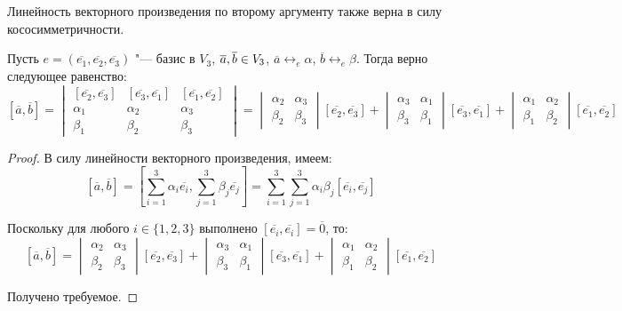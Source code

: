 \begin{note}
	Линейность векторного произведения по второму аргументу также верна в силу кососимметричности.
\end{note}

\begin{theorem}
	Пусть $e = (\overline{e_1}, \overline{e_2}, \overline{e_3})$ "--- базис в $V_3$, $\overline{a}, \overline{b} \hm{\in} V_3$, $\overline{a} \leftrightarrow_{e} \alpha$, $\overline{b} \leftrightarrow_{e} \beta$. Тогда верно следующее равенство:
	\[[\overline{a}, \overline{b}] =
	\begin{vmatrix}
	[\overline{e_2}, \overline{e_3}] & [\overline{e_3}, \overline{e_1}] & [\overline{e_1}, \overline{e_2}]\\
	\alpha_1 & \alpha_2 & \alpha_3\\
	\beta_1 & \beta_2 & \beta_3
	\end{vmatrix} = \begin{vmatrix}
	\alpha_2 & \alpha_3\\
	\beta_2 & \beta_3
	\end{vmatrix}[\overline{e_2}, \overline{e_3}] + 
	\begin{vmatrix}
	\alpha_3 & \alpha_1\\
	\beta_3 & \beta_1
	\end{vmatrix}[\overline{e_3}, \overline{e_1}] +
	\begin{vmatrix}
	\alpha_1 & \alpha_2\\
	\beta_1 & \beta_2
	\end{vmatrix}[\overline{e_1}, \overline{e_2}]
	\]
\end{theorem}

\begin{proof}
	В силу линейности векторного произведения, имеем:	
	\[[\overline{a}, \overline{b}] =\left[\sum_{i = 1}^{3}\alpha_i\overline{e_i}, \sum_{j = 1}^{3}\beta_j\overline{e_j}\right] = \sum_{i = 1}^{3}\sum_{j = 1}^{3}\alpha_i\beta_j[\overline{e_i}, \overline{e_j}]\]
	
	Поскольку для любого $i \in \{1, 2, 3\}$ выполнено $[\overline{e_i}, \overline{e_i}] = \overline{0}$, то:
	\[[\overline{a}, \overline{b}]=
	\begin{vmatrix}
	\alpha_2 & \alpha_3\\
	\beta_2 & \beta_3
	\end{vmatrix}[\overline{e_2}, \overline{e_3}] + 
	\begin{vmatrix}
	\alpha_3 & \alpha_1\\
	\beta_3 & \beta_1
	\end{vmatrix}[\overline{e_3}, \overline{e_1}] +
	\begin{vmatrix}
	\alpha_1 & \alpha_2\\
	\beta_1 & \beta_2
	\end{vmatrix}[\overline{e_1}, \overline{e_2}]\]

	Получено требуемое.
\end{proof}


